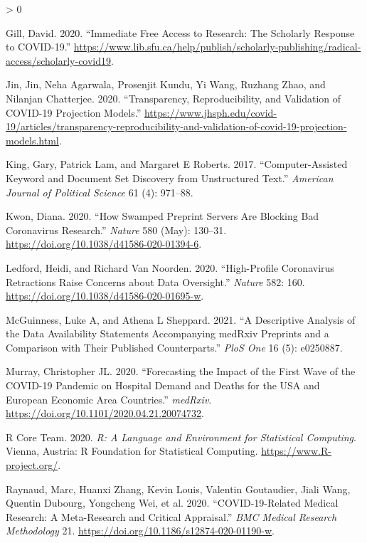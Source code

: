 \documentclass[
]{article}
\newlength{\cslhangindent}
\newenvironment{CSLReferences}[2] %
 {%
  \setlength{\parindent}{0pt}
  \ifodd #1 \everypar{\setlength{\hangindent}{\cslhangindent}}\ignorespaces\fi
  \ifnum #2 > 0
  \setlength{\parskip}{#2\baselineskip}
  \fi
 }%
 {}
\begin{document}
\begin{CSLReferences}{1}{0}
\leavevmode\hypertarget{ref-gill2020}{}%
Gill, David. 2020. {``Immediate Free Access to Research: The Scholarly Response to COVID-19.''} \url{https://www.lib.sfu.ca/help/publish/scholarly-publishing/radical-access/scholarly-covid19}.

\leavevmode\hypertarget{ref-jin2020}{}%
Jin, Jin, Neha Agarwala, Prosenjit Kundu, Yi Wang, Ruzhang Zhao, and Nilanjan Chatterjee. 2020. {``Transparency, Reproducibility, and Validation of COVID-19 Projection Models.''} \url{https://www.jhsph.edu/covid-19/articles/transparency-reproducibility-and-validation-of-covid-19-projection-models.html}.

\leavevmode\hypertarget{ref-king2017computer}{}%
King, Gary, Patrick Lam, and Margaret E Roberts. 2017. {``Computer-Assisted Keyword and Document Set Discovery from Unstructured Text.''} \emph{American Journal of Political Science} 61 (4): 971--88.

\leavevmode\hypertarget{ref-kwon2020}{}%
Kwon, Diana. 2020. {``How Swamped Preprint Servers Are Blocking Bad Coronavirus Research.''} \emph{Nature} 580 (May): 130--31. \url{https://doi.org/10.1038/d41586-020-01394-6}.

\leavevmode\hypertarget{ref-ledford2020}{}%
Ledford, Heidi, and Richard Van Noorden. 2020. {``High-Profile Coronavirus Retractions Raise Concerns about Data Oversight.''} \emph{Nature} 582: 160. \url{https://doi.org/10.1038/d41586-020-01695-w}.

\leavevmode\hypertarget{ref-mcguinness2021descriptive}{}%
McGuinness, Luke A, and Athena L Sheppard. 2021. {``A Descriptive Analysis of the Data Availability Statements Accompanying medRxiv Preprints and a Comparison with Their Published Counterparts.''} \emph{PloS One} 16 (5): e0250887.

\leavevmode\hypertarget{ref-murray2020}{}%
Murray, Christopher JL. 2020. {``Forecasting the Impact of the First Wave of the COVID-19 Pandemic on Hospital Demand and Deaths for the USA and European Economic Area Countries.''} \emph{medRxiv}. \url{https://doi.org/10.1101/2020.04.21.20074732}.

\leavevmode\hypertarget{ref-citeR}{}%
R Core Team. 2020. \emph{{R: A Language and Environment for Statistical Computing}}. Vienna, Austria: R Foundation for Statistical Computing. \url{https://www.R-project.org/}.

\leavevmode\hypertarget{ref-raynaud2021}{}%
Raynaud, Marc, Huanxi Zhang, Kevin Louis, Valentin Goutaudier, Jiali Wang, Quentin Dubourg, Yongcheng Wei, et al. 2020. {``COVID-19-Related Medical Research: A Meta-Research and Critical Appraisal.''} \emph{BMC Medical Research Methodology} 21. \url{https://doi.org/10.1186/s12874-020-01190-w}.


\end{CSLReferences}
\end{document}
